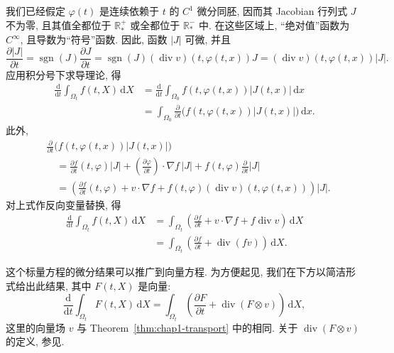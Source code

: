 \begin{Proof}
我们已经假定 $\varphi(t)$ 是连续依赖于 $t$ 的 $C^1$ 微分同胚, 因而其 Jacobian 行列式 $J$ 不为零, 且其值全都位于 $\mathbb{R}_*^+$ 或全都位于 $\mathbb{R}_*^-$ 中. 在这些区域上, ``绝对值''函数为 $C^\infty$, 且导数为``符号''函数. 因此, 函数 $\lvert J\rvert$ 可微, 并且
\[
  \frac{\partial\lvert J\rvert}{\partial t}
  =\operatorname{sgn}(J)\frac{\partial J}{\partial t}
  =\operatorname{sgn}(J)(\operatorname{div}v)(t,\varphi(t,x))J
  =(\operatorname{div}v)(t,\varphi(t,x))\lvert J\rvert.
\]
应用积分号下求导理论, 得
\begin{align*}
  \frac{\mathrm{d}}{\mathrm{d}t}\int_{\Omega_t}f(t,X)\,\mathrm{d}X
  &=\frac{\mathrm{d}}{\mathrm{d}t}\int_{\Omega_0}f(t,\varphi(t,x))\lvert J(t,x)\rvert\,\mathrm{d}x\\
  &=\int_{\Omega_0}\frac{\partial}{\partial t}
    \bigl(f(t,\varphi(t,x))\lvert J(t,x)\rvert\bigr)\,\mathrm{d}x.
\end{align*}
此外,
\begin{align*}
  &\frac{\partial}{\partial t}
  \bigl(f(t,\varphi(t,x))\lvert J(t,x)\rvert\bigr)\\
  &\quad=\frac{\partial f}{\partial t}(t,\varphi)\lvert J\rvert
  +\left(\frac{\partial\varphi}{\partial t}\right)\!\cdot\nabla f\,\lvert J\rvert
  +f(t,\varphi)\frac{\partial}{\partial t}\lvert J\rvert\\
  &\quad=\left(
  \frac{\partial f}{\partial t}(t,\varphi)+v\cdot\nabla f
  +f(t,\varphi)(\operatorname{div}v)(t,\varphi(t,x))
  \right)\lvert J\rvert.
\end{align*}
对上式作反向变量替换, 得
\begin{align*}
  \frac{\mathrm{d}}{\mathrm{d}t}\int_{\Omega_t}f(t,X)\,\mathrm{d}X
  &=\int_{\Omega_t}\left(
  \frac{\partial f}{\partial t}+v\cdot\nabla f+f\operatorname{div}v
  \right)\,\mathrm{d}X\\
  &=\int_{\Omega_t}\left(
  \frac{\partial f}{\partial t}+\operatorname{div}(fv)
  \right)\,\mathrm{d}X.
\end{align*}
\end{Proof}

\begin{Remark}
\label{rem:chap1-transport-vector}
这个标量方程的微分结果可以推广到向量方程. 为方便起见, 我们在下方以简洁形式给出此结果, 其中 $F(t,X)$ 是向量:
\[
  \frac{\mathrm{d}}{\mathrm{d}t}\int_{\Omega_t}F(t,X)\,\mathrm{d}X
  =\int_{\Omega_t}\left(
  \frac{\partial F}{\partial t}+\operatorname{div}(F\otimes v)
  \right)\,\mathrm{d}X,
\]
这里的向量场 $v$ 与 Theorem~\ref{thm:chap1-transport} 中的相同. 关于 $\operatorname{div}(F\otimes v)$ 的定义, 参见.
\end{Remark}
